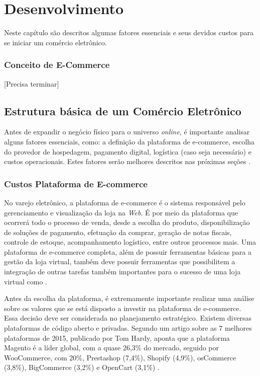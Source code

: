 \chapter{Desenvolvimento}

Neste capítulo são descritos algumas fatores essenciais e seus devidos custos para se iniciar um comércio eletrônico.

\subsection{Conceito de E-Commerce}

[Precisa terminar]

\section{Estrutura básica de um Comércio Eletrônico}

Antes de expandir o negócio físico para o universo \textit{online}, é importante analisar alguns fatores essenciais, como: a definição da plataforma de e-commerce, escolha do provedor de hospedagem, pagamento digital, logística (caso seja necessário) e custos operacionais.  Estes fatores serão melhores descritos nas próximas seções \cite{Roitman2010}.

\subsection{Custos Plataforma de E-commerce}

No varejo eletrônico, a plataforma de e-commerce é o sistema responsável pelo gerenciamento e visualização da loja na \textit{Web}. É por meio da plataforma que ocorrerá todo o processo de venda, desde a escolha do produto, disponibilização de soluções de pagamento, efetuação da comprar, geração de notas fiscais, controle de estoque, acompanhamento logístico, entre outros processos mais. Uma plataforma de e-commerce completa, além de possuir ferramentas básicas para a gestão da loja virtual, também deve possuir ferramentas que possibilitem a integração de outras tarefas também importantes para o sucesso de uma loja virtual como \cite{Valle2014}.

Antes da escolha da plataforma, é extremamente importante realizar uma análise sobre os valores que se está disposto a investir na plataforma de e-commerce. Essa decisão deve ser considerada no planejamento estratégico. Existem diversas plataformas de código aberto e privadas. Segundo um artigo sobre as 7 melhores plataformas de 2015, publicado por Tom Hardy, aponta que a plataforma Magento é a líder global, com a quase 26,3\% do mercado, seguido por WooCommerce, com 20\%, Prestashop (7,4\%), Shopify (4,9\%), osCommerce (3,8\%), BigCommerce (3,2\%) e OpenCart (3,1\%) \cite{Hardy2015}.

